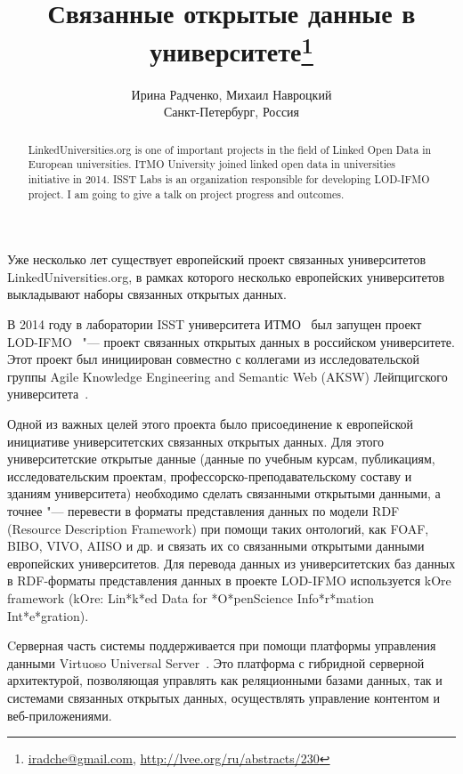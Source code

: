 \documentclass[10pt, a5paper]{article}
\begin{document}
\title{Связанные открытые данные в университете\footnote{\url{iradche@gmail.com}, \url{http://lvee.org/ru/abstracts/230}}}
\author{Ирина Радченко, Михаил Навроцкий \\Санкт-Петербург, Россия}
\maketitle
\begin{abstract}
LinkedUniversities.org is one of important projects in the field of Linked Open Data in European universities.
ITMO \linebreak University joined linked open data in universities initiative in 2014. ISST Labs is an organization responsible for developing LOD-IFMO project. I am going to give a talk on project progress and outcomes.
\end{abstract}
Уже несколько лет существует европейский проект связанных университетов LinkedUniversities.org, в рамках которого несколько европейских университетов выкладывают наборы связанных открытых данных.

В 2014 году в лаборатории ISST университета ИТМО~\cite{Radchenko1} был запущен проект LOD-IFMO~\cite{Radchenko2} "--- проект связанных открытых данных в российском университете. Этот проект был инициирован совместно с коллегами из исследовательской группы Agile Knowledge Engineering and Semantic Web (AKSW) Лейпцигского университета~\cite{Radchenko3}.

Одной из важных целей этого проекта было присоединение к европейской инициативе университетских связанных открытых данных. Для этого университетские открытые данные (данные по учебным курсам, публикациям, исследовательским проектам, \linebreak профессорско-преподавательскому составу и зданиям университета) необходимо сделать связанными открытыми данными, а точнее "--- перевести в форматы представления данных по модели RDF (Resource Description Framework) при помощи таких онтологий, как FOAF, BIBO, VIVO, AIISO и др. и связать их со связанными открытыми данными европейских университетов. Для перевода данных из университетских баз данных в RDF-форматы представления данных в проекте LOD-IFMO используется kOre framework (kOre: Lin*k*ed Data for *O*penScience Info*r*mation Int*e*gration).

Cерверная часть системы поддерживается при помощи платформы управления данными Virtuoso Universal Server~\cite{Radchenko4}. Это платформа с гибридной серверной архитектурой, позволяющая управлять как реляционными базами данных, так и системами связанных открытых данных, осуществлять управление контентом и веб-приложениями.
\end{document}
